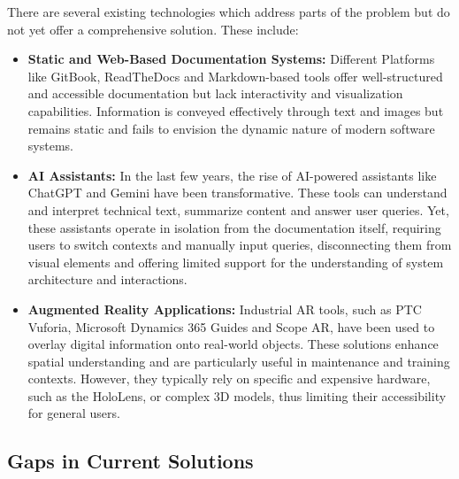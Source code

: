 \documentclass[12pt]{article}
\begin{document}
    There are several existing technologies which address parts of the problem but do not yet offer a comprehensive solution. These include:
        \begin{itemize}
            \item \textbf{Static and Web-Based Documentation Systems:}
                Different Platforms like GitBook, ReadTheDocs and Markdown-based tools offer well-structured and accessible documentation but lack interactivity and visualization capabilities. Information is conveyed effectively through text and images
                but remains static and fails to envision the dynamic nature of modern software systems.
            \item \textbf{AI Assistants:}
                In the last few years, the rise of AI-powered assistants like ChatGPT and Gemini have been transformative. These tools can understand and interpret technical text, summarize content and answer user queries. Yet, these
                assistants operate in isolation from the documentation itself, requiring users to switch contexts and manually input queries, disconnecting them from visual elements and offering limited support for the understanding of
                system architecture and interactions.
            \item \textbf{Augmented Reality Applications:}
                Industrial AR tools, such as PTC Vuforia, Microsoft Dynamics 365 Guides and Scope AR, have been used to overlay digital information onto real-world objects. These solutions enhance spatial understanding and are particularly useful in maintenance
                and training contexts. However, they typically rely on specific and expensive hardware, such as the HoloLens, or complex 3D models, thus limiting their accessibility for general users.
        \end{itemize}

    \subsection{Gaps in Current Solutions}
\end{document}

